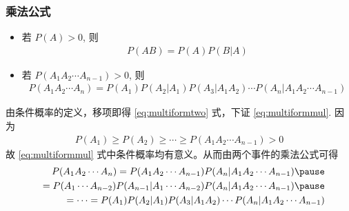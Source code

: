 \begin{frame}
	\frametitle{乘法公式}
	\begin{thm}[乘法公式]
		\begin{itemize}[<+-|alert@+>]
			\item 若 $P (A)>0$, 则 %
			\begin{eqnarray}
				\label{eq:multiformtwo}
				P(AB)=P(A)P(B|A)
			\end{eqnarray}
			\item 若 $P (A_1A_2\cdots A_{n-1})>0$, 则
			\begin{eqnarray}
				\label{eq:multiformmul}
				P(A_1A_2\cdots A_n)=P(A_1)P(A_2|A_1)P(A_3|A_1A_2)\cdots P(A_n|A_1A_2\cdots A_{n-1})
			\end{eqnarray}

		\end{itemize}
	\end{thm}
	\pause \zheng  由条件概率的定义，移项即得 \eqref{eq:multiformtwo} 式，下证 \eqref{eq:multiformmul}. \pause 因为
	\begin{eqnarray*}
		P(A_1)\ge P(A_2)\ge\cdots\ge P(A_1A_2\cdots A_{n-1})>0
	\end{eqnarray*}
	故 \eqref{eq:multiformmul} 式中条件概率均有意义。从而由两个事件的乘法公式可得
	\pause \begin{eqnarray*}
		&&P(A_1A_2\cdots A_n)=P(A_1A_2\cdots A_{n-1})P(A_n|A_1A_2\cdots A_{n-1})\pause \\
		&&=P(A_1\cdots A_{n-2})P(A_{n-1}|A_1\cdots A_{n-2})P(A_n|A_1A_2\cdots A_{n-1})\pause \\
		&&=\cdots =P(A_1)P(A_2|A_1)P(A_3|A_1A_2)\cdots P(A_n|A_1A_2\cdots A_{n-1})
	\end{eqnarray*}

\end{frame}





